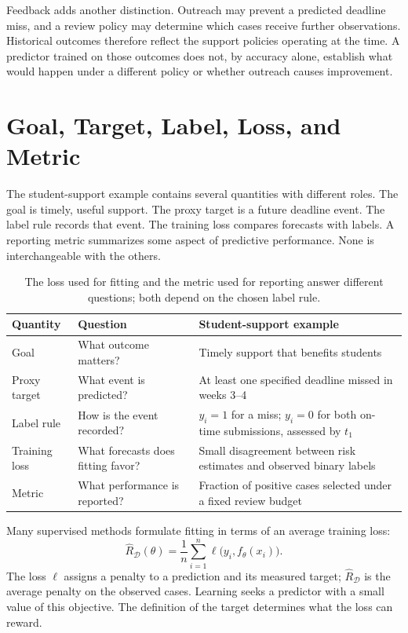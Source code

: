 Feedback adds another distinction. Outreach may prevent a predicted deadline miss, and a review policy may determine which cases receive further observations. Historical outcomes therefore reflect the support policies operating at the time. A predictor trained on those outcomes does not, by accuracy alone, establish what would happen under a different policy or whether outreach causes improvement.

\section{Goal, Target, Label, Loss, and Metric}

The student-support example contains several quantities with different roles. The goal is timely, useful support. The proxy target is a future deadline event. The label rule records that event. The training loss compares forecasts with labels. A reporting metric summarizes some aspect of predictive performance. None is interchangeable with the others.

\begin{table}[t]
\centering
\small
\setlength{\tabcolsep}{4pt}
\begin{tabular}{L{2.10cm}L{3.00cm}L{5.00cm}}
\toprule
Quantity & Question & Student-support example \\
\midrule
Goal & What outcome matters? & Timely support that benefits students \\
Proxy target & What event is predicted? & At least one specified deadline missed in weeks 3--4 \\
Label rule & How is the event recorded? & $y_i=1$ for a miss; $y_i=0$ for both on-time submissions, assessed by $t_1$ \\
Training loss & What forecasts does fitting favor? & Small disagreement between risk estimates and observed binary labels \\
Metric & What performance is reported? & Fraction of positive cases selected under a fixed review budget \\
\bottomrule
\end{tabular}
\caption{The loss used for fitting and the metric used for reporting answer different questions; both depend on the chosen label rule.}
\label{tab:objective-hierarchy}
\end{table}

Many supervised methods formulate fitting in terms of an average training loss:
\[
\hat R_{\mathcal{D}}(\theta)=\frac{1}{n}\sum_{i=1}^{n}
\ell\bigl(y_i,f_\theta(x_i)\bigr).
\]
The loss $\ell$ assigns a penalty to a prediction and its measured target; $\hat R_{\mathcal{D}}$ is the average penalty on the observed cases. Learning seeks a predictor with a small value of this objective. The definition of the target determines what the loss can reward.

